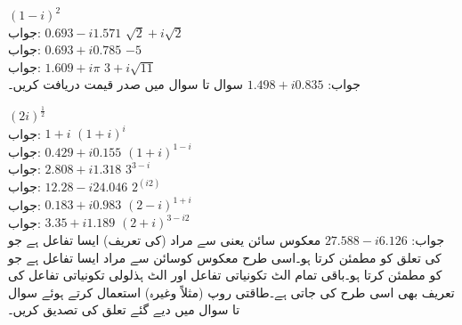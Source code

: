\quad 
$(1-i)^2$\\
جواب:\quad
$0.693-i1.571$
\quad 
$\sqrt{2}+i\sqrt{2}$\\
جواب:\quad
$0.693+i0.785$
\quad 
$-5$\\
جواب:\quad
$1.609+i\pi$
\quad 
$3+i\sqrt{11}$\\
جواب:\quad
$1.498+i0.835$
سوال  تا سوال  میں صدر قیمت دریافت کریں۔

\quad
$(2i)^{\tfrac{1}{2}}$\\
جواب:\quad
$1+i$
\quad
$(1+i)^i$\\
جواب:\quad
$0.429+i0.155$
\quad
$(1+i)^{1-i}$\\
جواب:\quad
$2.808+i1.318$
\quad
$3^{3-i}$\\
جواب:\quad
$12.28-i24.046$
\quad
$2^(i2)$\\
جواب:\quad
$0.183+i0.983$
\quad
$(2-i)^{1+i}$\\
جواب:\quad
$3.35+i1.189$
\quad
$(2+i)^{3-i2}$\\
جواب:\quad
$27.588-i6.126$
معکوس سائن یعنی  سے مراد (کی تعریف) ایسا تفاعل ہے جو  کی تعلق کو مطمئن کرتا ہو۔اسی طرح معکوس کوسائن  سے مراد ایسا تفاعل ہے جو  کو مطمئن کرتا ہو۔باقی تمام الٹ تکونیاتی تفاعل اور الٹ ہذلولی تکونیاتی تفاعل کی تعریف بھی اسی طرح کی جاتی ہے۔طاقتی روپ (مثلاً  وغیرہ) استعمال کرتے ہوئے سوال  تا سوال  میں دیے گئے تعلق کی تصدیق کریں۔

